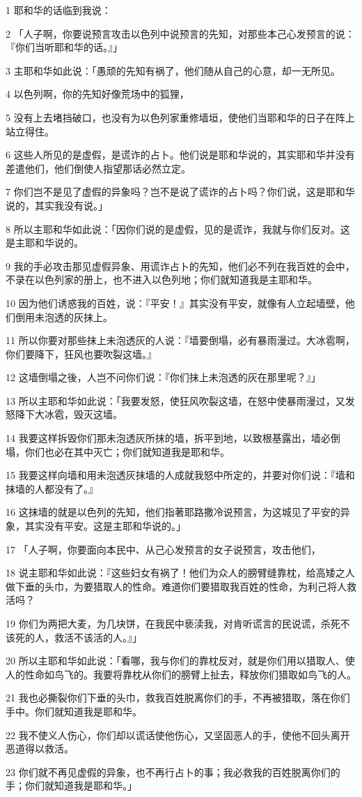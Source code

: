\par 1 耶和华的话临到我说：
\par 2 「人子啊，你要说预言攻击以色列中说预言的先知，对那些本己心发预言的说：『你们当听耶和华的话。』」
\par 3 主耶和华如此说：「愚顽的先知有祸了，他们随从自己的心意，却一无所见。
\par 4 以色列啊，你的先知好像荒场中的狐狸，
\par 5 没有上去堵挡破口，也没有为以色列家重修墙垣，使他们当耶和华的日子在阵上站立得住。
\par 6 这些人所见的是虚假，是谎诈的占卜。他们说是耶和华说的，其实耶和华并没有差遣他们，他们倒使人指望那话必然立定。
\par 7 你们岂不是见了虚假的异象吗？岂不是说了谎诈的占卜吗？你们说，这是耶和华说的，其实我没有说。」
\par 8 所以主耶和华如此说：「因你们说的是虚假，见的是谎诈，我就与你们反对。这是主耶和华说的。
\par 9 我的手必攻击那见虚假异象、用谎诈占卜的先知，他们必不列在我百姓的会中，不录在以色列家的册上，也不进入以色列地；你们就知道我是主耶和华。
\par 10 因为他们诱惑我的百姓，说：『平安！』其实没有平安，就像有人立起墙壁，他们倒用未泡透的灰抹上。
\par 11 所以你要对那些抹上未泡透灰的人说：『墙要倒塌，必有暴雨漫过。大冰雹啊，你们要降下，狂风也要吹裂这墙。』
\par 12 这墙倒塌之後，人岂不问你们说：『你们抹上未泡透的灰在那里呢？』」
\par 13 所以主耶和华如此说：「我要发怒，使狂风吹裂这墙，在怒中使暴雨漫过，又发怒降下大冰雹，毁灭这墙。
\par 14 我要这样拆毁你们那未泡透灰所抹的墙，拆平到地，以致根基露出，墙必倒塌，你们也必在其中灭亡；你们就知道我是耶和华。
\par 15 我要这样向墙和用未泡透灰抹墙的人成就我怒中所定的，并要对你们说：『墙和抹墙的人都没有了。』
\par 16 这抹墙的就是以色列的先知，他们指著耶路撒冷说预言，为这城见了平安的异象，其实没有平安。这是主耶和华说的。」
\par 17 「人子啊，你要面向本民中、从己心发预言的女子说预言，攻击他们，
\par 18 说主耶和华如此说：『这些妇女有祸了！他们为众人的膀臂缝靠枕，给高矮之人做下垂的头巾，为要猎取人的性命。难道你们要猎取我百姓的性命，为利己将人救活吗？
\par 19 你们为两把大麦，为几块饼，在我民中亵渎我，对肯听谎言的民说谎，杀死不该死的人，救活不该活的人。』」
\par 20 所以主耶和华如此说：「看哪，我与你们的靠枕反对，就是你们用以猎取人、使人的性命如鸟飞的。我要将靠枕从你们的膀臂上扯去，释放你们猎取如鸟飞的人。
\par 21 我也必撕裂你们下垂的头巾，救我百姓脱离你们的手，不再被猎取，落在你们手中。你们就知道我是耶和华。
\par 22 我不使义人伤心，你们却以谎话使他伤心，又坚固恶人的手，使他不回头离开恶道得以救活。
\par 23 你们就不再见虚假的异象，也不再行占卜的事；我必救我的百姓脱离你们的手；你们就知道我是耶和华。」


